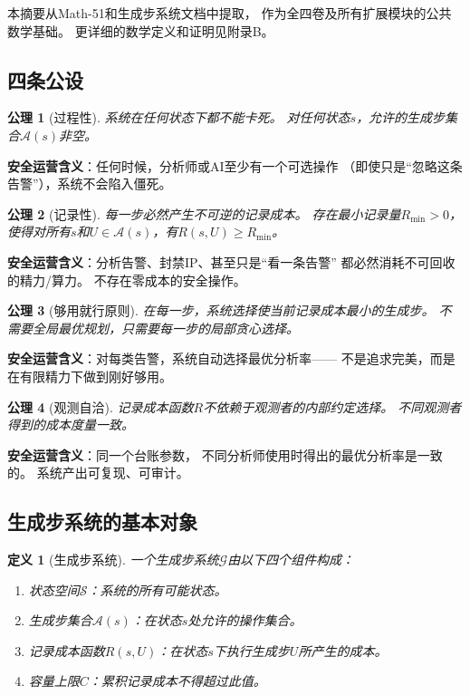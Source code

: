 \documentclass[11pt,a4paper]{article}
\newtheorem{definition}{定义}[section]
\newtheorem{axiom}{公理}[section]
\begin{document}
本摘要从Math-51和生成步系统文档中提取，
作为全四卷及所有扩展模块的公共数学基础。
更详细的数学定义和证明见附录B。

\subsection{四条公设}

\begin{axiom}[过程性]\label{ax:process}
系统在任何状态下都不能卡死。
对任何状态$s$，允许的生成步集合$\mathcal{A}(s)$非空。
\end{axiom}

\textbf{安全运营含义}：任何时候，分析师或AI至少有一个可选操作
（即使只是“忽略这条告警”），系统不会陷入僵死。

\begin{axiom}[记录性]\label{ax:record}
每一步必然产生不可逆的记录成本。
存在最小记录量$R_{\min} > 0$，
使得对所有$s$和$U \in \mathcal{A}(s)$，有$R(s,U) \ge R_{\min}$。
\end{axiom}

\textbf{安全运营含义}：分析告警、封禁IP、甚至只是“看一条告警”
都必然消耗不可回收的精力/算力。
不存在零成本的安全操作。

\begin{axiom}[够用就行原则]\label{ax:satisficing}
在每一步，系统选择使当前记录成本最小的生成步。
不需要全局最优规划，只需要每一步的局部贪心选择。
\end{axiom}

\textbf{安全运营含义}：对每类告警，系统自动选择最优分析率——
不是追求完美，而是在有限精力下做到刚好够用。

\begin{axiom}[观测自洽]\label{ax:obs}
记录成本函数$R$不依赖于观测者的内部约定选择。
不同观测者得到的成本度量一致。
\end{axiom}

\textbf{安全运营含义}：同一个台账参数，
不同分析师使用时得出的最优分析率是一致的。
系统产出可复现、可审计。

\subsection{生成步系统的基本对象}

\begin{definition}[生成步系统]
一个生成步系统$\mathcal{G}$由以下四个组件构成：
\begin{enumerate}[label=(\arabic*)]
    \item 状态空间$\mathcal{S}$：系统的所有可能状态。
    \item 生成步集合$\mathcal{A}(s)$：在状态$s$处允许的操作集合。
    \item 记录成本函数$R(s,U)$：在状态$s$下执行生成步$U$所产生的成本。
    \item 容量上限$C$：累积记录成本不得超过此值。
\end{enumerate}
\end{definition}
\end{document}
